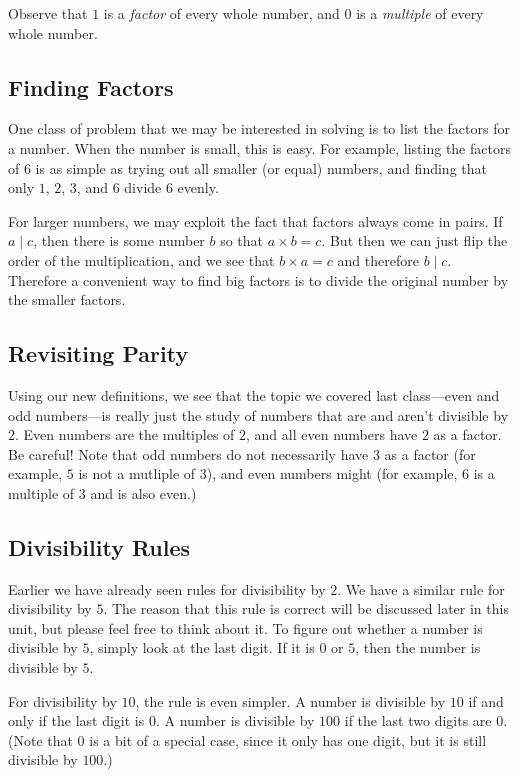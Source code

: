 \documentclass[a4paper,10pt]{report}
\begin{document}
Observe that $1$ is a \emph{factor} of every whole number, and $0$ is a
\emph{multiple} of every whole number.

\subsection{Finding Factors}

One class of problem that we may be interested in solving is to list the factors
for a number. When the number is small, this is easy. For example, listing the
factors of $6$ is as simple as trying out all smaller (or equal) numbers, and
finding that only $1$, $2$, $3$, and $6$ divide $6$ evenly.

For larger numbers, we may exploit the fact that factors always come in pairs.
If $a \mid c$, then there is some number $b$ so that $a \times b = c$. But then
we can just flip the order of the multiplication, and we see that $b \times a =
c$ and therefore $b \mid c$. Therefore a convenient way to find big factors is
to divide the original number by the smaller factors.

\subsection{Revisiting Parity}

Using our new definitions, we see that the topic we covered last class---even
and odd numbers---is really just the study of numbers that are and aren't
divisible by $2$. Even numbers are the multiples of $2$, and all even numbers
have $2$ as a factor. Be careful! Note that odd numbers do not necessarily have
$3$ as a factor (for example, $5$ is not a mutliple of $3$), and even numbers
might (for example, $6$ is a multiple of $3$ and is also even.)

\subsection{Divisibility Rules}

Earlier we have already seen rules for divisibility by $2$. We have a similar
rule for divisibility by $5$. The reason that this rule is correct will be
discussed later in this unit, but please feel free to think about it. To figure
out whether a number is divisible by $5$, simply look at the last digit. If it
is $0$ or $5$, then the number is divisible by $5$.

For divisibility by $10$, the rule is even simpler. A number is divisible by
$10$ if and only if the last digit is $0$. A number is divisible by $100$ if the
last two digits are $0$. (Note that $0$ is a bit of a special case, since it
only has one digit, but it is still divisible by $100$.)
\end{document}
